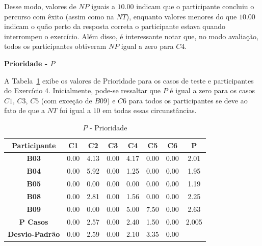 Desse modo, valores de $NP$ iguais a $10.00$ indicam que o participante concluiu o percurso com êxito (assim como na $NT$), enquanto valores menores do que $10.00$ indicam o quão perto da resposta correta o participante estava quando interrompeu o exercício. Além disso, é interessante notar que, no modo avaliação, todos os participantes obtiveram $NP$ igual a zero para $C4$.

\textbf{Prioridade - $P$}

A Tabela~\ref{tab:F3_A4_P} exibe os valores de Prioridade para os casos de teste e participantes do Exercício 4. Inicialmente, pode-se ressaltar que $P$ é igual a zero para os casos $C1$, $C3$, $C5$ (com exceção de $B09$) e $C6$ para todos os participantes se deve ao fato de que a $NT$ foi igual a $10$ em todas essas circunstâncias.


\begin{table}[htbp]
	\centering
	\caption{$P$ - Prioridade}
	\begin{tabular}{|c|c|c|c|c|c|c|c}
		\hline
		\rowcolor[HTML]{D9D9D9} 
		\textbf{Participante} & \textbf{C1} & \textbf{C2} & \textbf{C3} & \textbf{C4} & \textbf{C5} & \textbf{C6} & \multicolumn{1}{c|}{\cellcolor[HTML]{D9D9D9}\textbf{P}} \\ \hline
		\rowcolor[HTML]{FFFFFF} 
		\textbf{B03} & 0.00 & 4.13 & 0.00 & 4.17 & 0.00 & 0.00 & \multicolumn{1}{c|}{\cellcolor[HTML]{FFFFFF}2.01} \\ \hline
		\rowcolor[HTML]{E7E6E6} 
		\textbf{B04} & 0.00 & 5.92 & 0.00 & 1.25 & 0.00 & 0.00 & \multicolumn{1}{c|}{\cellcolor[HTML]{E7E6E6}1.95} \\ \hline
		\rowcolor[HTML]{FFFFFF} 
		\textbf{B05} & 0.00 & 0.00 & 0.00 & 0.00 & 0.00 & 0.00 & \multicolumn{1}{c|}{\cellcolor[HTML]{FFFFFF}1.19} \\ \hline
		\rowcolor[HTML]{E7E6E6} 
		\textbf{B08} & 0.00 & 2.81 & 0.00 & 1.56 & 0.00 & 0.00 & \multicolumn{1}{c|}{\cellcolor[HTML]{E7E6E6}2.25} \\ \hline
		\rowcolor[HTML]{FFFFFF} 
		\textbf{B09} & 0.00 & 0.00 & 0.00 & 5.00 & 7.50 & 0.00 & \multicolumn{1}{c|}{\cellcolor[HTML]{FFFFFF}2.63} \\ \hline
		\rowcolor[HTML]{D0CECE} 
		\textbf{P Casos} & 0.00 & 2.57 & 0.00 & 2.40 & 1.50 & 0.00 & \multicolumn{1}{c|}{\cellcolor[HTML]{D0CECE}2.005} \\ \hline
		\textbf{Desvio-Padrão} & 0.00 & 2.59 & 0.00 & 2.10 & 3.35 & 0.00 & \multicolumn{1}{l}{} \\ \cline{1-7}
	\end{tabular}
	\label{tab:F3_A4_P}
\end{table}

